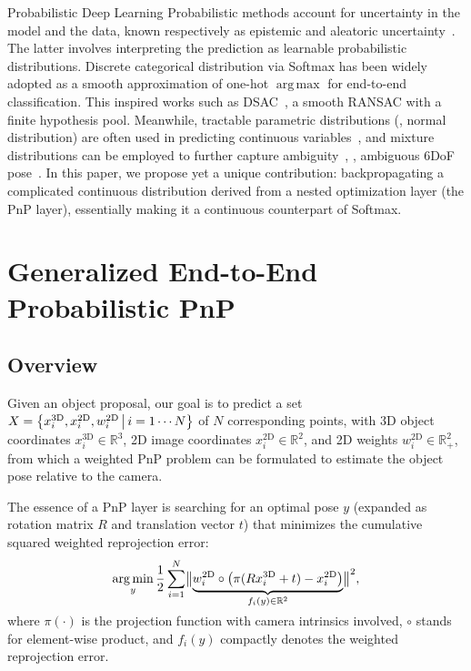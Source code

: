 \documentclass[10pt,twocolumn,letterpaper]{article}
\makeatletter
\let\originalleft\left
\let\originalright\right
\renewcommand{\left}{\mathopen{}\mathclose\bgroup\originalleft}
\renewcommand{\right}{\aftergroup\egroup\originalright}
\DeclareMathOperator*{\argmax}{arg\,max}
\DeclareMathOperator*{\argmin}{arg\,min}
\renewcommand{\paragraph}{
  \@startsection{paragraph}{4}
  {\z@}{1.0ex \@plus 0ex \@minus .3ex}{-1em}
  {\normalfont\normalsize\bfseries}
}
\makeatother
\begin{document}
\paragraph{Probabilistic Deep Learning}
Probabilistic methods account for uncertainty in the model and the data, known respectively as epistemic and aleatoric uncertainty~\cite{kendall2017uncertainties}. The latter involves interpreting the prediction as learnable probabilistic distributions. Discrete categorical distribution via Softmax has been widely adopted as a smooth approximation of one-hot $\argmax$ for end-to-end classification. This inspired works such as DSAC~\cite{dsac}, a smooth RANSAC with a finite hypothesis pool. Meanwhile, tractable parametric distributions (\eg, normal distribution) are often used in predicting continuous variables~\cite{klloss, wu2020unsupervised, kendall2017uncertainties, VAE, Gilitschenski2020, monorun}, and mixture distributions can be employed to further capture ambiguity~\cite{makansi2019, Bishop94mixturedensity, Brachmann_2016_CVPR}, \eg, ambiguous 6DoF pose~\cite{bui20206d}. In this paper, we propose yet a unique contribution: backpropagating a complicated continuous distribution derived from a nested optimization layer (the PnP layer), essentially making it a continuous counterpart of Softmax.


\section{Generalized End-to-End Probabilistic PnP}

\subsection{Overview} \label{overview}

Given an object proposal,
our goal is to predict a set $X = \left\{x^\text{3D}_i,x^\text{2D}_i,w^\text{2D}_i\,\middle|\,i=1\cdots N\right\}$ of $N$ corresponding points, with 3D object coordinates $x^\text{3D}_i \in \mathbb{R}^3$, 2D image coordinates $x^\text{2D}_i \in \mathbb{R}^2$, and 2D weights $w^\text{2D}_i \in \mathbb{R}^2_+ $, from which a weighted PnP problem can be formulated to estimate the object pose relative to the camera.

The essence of a PnP layer is searching for an optimal pose $y$ (expanded as rotation matrix $R$ and translation vector $t$) that minimizes the cumulative squared weighted reprojection error:
\vspace{-1ex}
\begin{equation}
\smash[b]{\argmin_{y} \frac{1}{2} \sum_{i=1}^N \left\| \smash[b]{\underbrace{w_i^\text{2D} \circ \left( \pi(Rx_i^\text{3D} + t) - x_i^\text{2D} \right)}_{f_i(y) \in \mathbb{R}^2}} \right\|^2,}
\vphantom{\underbrace{\left((O_o^O)\right)}_{o}}
\label{eqn:basicpnp}
\end{equation}
where $\pi(\cdot)$ is the projection function with camera intrinsics involved, $\circ$ stands for element-wise product, and $f_i(y)$ compactly denotes the weighted reprojection error.
\end{document}
